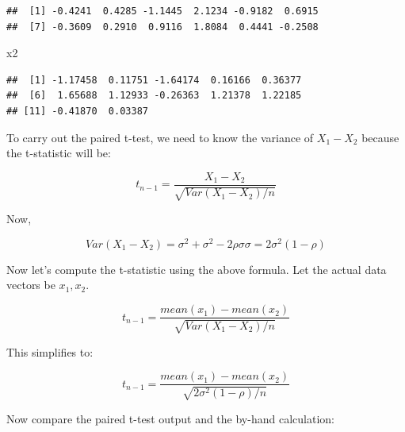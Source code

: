 \documentclass[12pt,]{krantz}
\newenvironment{Shaded}{\begin{snugshade}}{\end{snugshade}}
\newcommand{\DataTypeTok}[1]{\textcolor[rgb]{0.13,0.29,0.53}{#1}}
\newcommand{\KeywordTok}[1]{\textcolor[rgb]{0.13,0.29,0.53}{\textbf{#1}}}
\newcommand{\NormalTok}[1]{#1}
\newcommand{\OperatorTok}[1]{\textcolor[rgb]{0.81,0.36,0.00}{\textbf{#1}}}
\newcommand{\OtherTok}[1]{\textcolor[rgb]{0.56,0.35,0.01}{#1}}
\begin{document}
\begin{verbatim}
##  [1] -0.4241  0.4285 -1.1445  2.1234 -0.9182  0.6915
##  [7] -0.3609  0.2910  0.9116  1.8084  0.4441 -0.2508
\end{verbatim}

\begin{Shaded}
\begin{Highlighting}[]
\NormalTok{x2}
\end{Highlighting}
\end{Shaded}

\begin{verbatim}
##  [1] -1.17458  0.11751 -1.64174  0.16166  0.36377
##  [6]  1.65688  1.12933 -0.26363  1.21378  1.22185
## [11] -0.41870  0.03387
\end{verbatim}

To carry out the paired t-test,
we need to know the variance of \(X_1-X_2\) because the t-statistic will be:

\begin{equation}
t_{n-1} = \frac{X_1 - X_2}{\sqrt{Var(X_1 - X_2)/n}}
\end{equation}

Now,

\begin{equation}
Var(X_1 - X_2) = \sigma^2 + \sigma^2 - 2 \rho \sigma\sigma = 2\sigma^2 (1-\rho)
\end{equation}

Now let's compute the t-statistic using the above formula. Let the actual data vectors be \(x_1, x_2\).

\begin{equation}
t_{n-1} = \frac{mean(x_1) - mean(x_2)}{\sqrt{Var(X_1 - X_2)/n}}
\end{equation}

This simplifies to:

\begin{equation}
t_{n-1} = \frac{mean(x_1) - mean(x_2)}{\sqrt{2\sigma^2(1-\rho)/n}}
\end{equation}

Now compare the paired t-test output and the by-hand calculation:

\begin{Shaded}
\end{Shaded}
\end{document}
